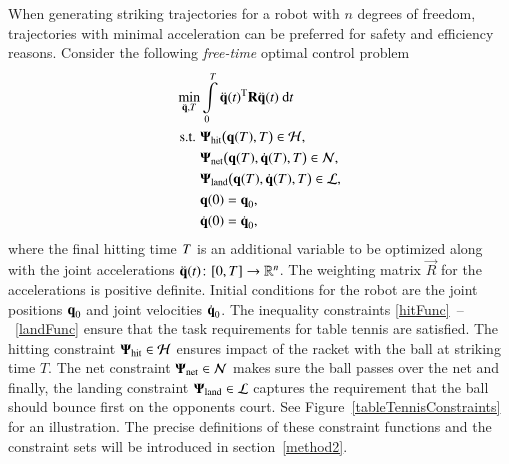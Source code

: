 %
%
When generating striking trajectories for a robot with $n$ degrees of freedom, trajectories with minimal acceleration can be preferred for safety and efficiency reasons. Consider the following \emph{free-time} optimal control problem~\citep{Liberzon11}
%
\begin{align}
\min_{\ddot{\boldsymbol{\mathrm{q}}},T} & \int\limits_{0}^{T} \ddot{\boldsymbol{\mathrm{q}}}(t)^{\mathrm{T}}\boldsymbol{\mathrm{R}}\ddot{\boldsymbol{\mathrm{q}}}(t) \ \mathrm{d}t \label{costFnc1} \\
\text{s.t. }  
&\boldsymbol{\mathrm{\Psi}}_{\mathrm{hit}}\big(\boldsymbol{\mathrm{q}}(T),T\big) \in \mathcal{H}, \label{hitFunc} \\
&\boldsymbol{\mathrm{\Psi}}_{\mathrm{net}}\big(\boldsymbol{\mathrm{q}}(T),\dot{\boldsymbol{\mathrm{q}}}(T),T\big) \in \mathcal{N}, \label{netFunc} \\
&\boldsymbol{\mathrm{\Psi}}_{\mathrm{land}}\big(\boldsymbol{\mathrm{q}}(T),\dot{\boldsymbol{\mathrm{q}}}(T),T\big) \in \mathcal{L}, \label{landFunc} \\
& \boldsymbol{\mathrm{q}}(0) = \boldsymbol{\mathrm{q}}_{0}, \label{initCond1} \\
& \dot{\boldsymbol{\mathrm{q}}}(0) = \dot{\boldsymbol{\mathrm{q}}}_{0}, \label{initCond2}
\end{align}
%
\noindent where the final hitting time $T$ is an additional variable to be optimized along with the joint accelerations $\ddot{\boldsymbol{\mathrm{q}}}(t) \colon [0,T] \to \mathbb{R}^{n}$. The weighting matrix $\vec{R}$ for the accelerations is positive definite. %
Initial conditions for the robot are the joint positions $\boldsymbol{\mathrm{q}}_0$ and joint velocities $\dot{\boldsymbol{\mathrm{q}}}_0$.
The inequality constraints \mbox{\eqref{hitFunc} -- \eqref{landFunc}} ensure that the task requirements for table tennis are satisfied. The hitting constraint $\boldsymbol{\mathrm{\Psi}}_{\mathrm{hit}} \in \mathcal{H}$ ensures impact of the racket with the ball at striking time $T$. The net constraint $\boldsymbol{\mathrm{\Psi}}_{\mathrm{net}} \in \mathcal{N}$ makes sure the ball passes over the net and finally, the landing constraint $\boldsymbol{\mathrm{\Psi}}_{\mathrm{land}} \in \mathcal{L}$ captures the requirement that the ball should bounce first on the opponents court. See Figure~\ref{tableTennisConstraints} for an illustration. The precise definitions of these constraint functions and the constraint sets will be introduced in section~\ref{method2}.

